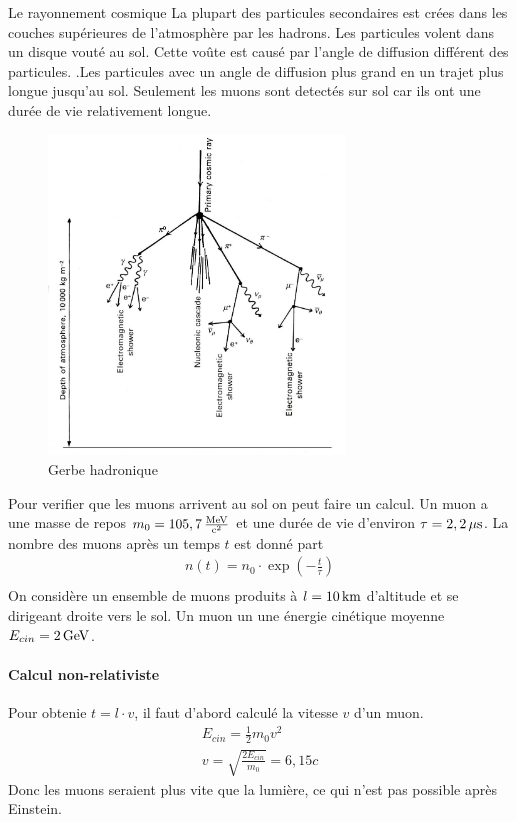 \documentclass[a4paper,11pt,liststotocnumbered,bibtotocnumbered]{scrartcl}
\begin{document}
\begin{section}{Le rayonnement cosmique}
   La plupart des particules secondaires est crées dans les couches supérieures de l'atmosphère par les hadrons. Les particules volent dans un disque vouté au sol. Cette voûte est causé par l'angle de diffusion différent des particules. .Les particules avec un angle de diffusion plus grand en un trajet plus longue jusqu'au sol. Seulement les muons sont detectés sur sol car ils ont une durée de vie relativement longue. 
   \begin{figure}[H]
    \center
     \includegraphics[width=0.7\textwidth]{bilder/hadronischer_schauer.jpg}
     \caption{Gerbe hadronique}
   \end{figure}
    
   Pour verifier que les muons arrivent au sol on peut faire un calcul. Un muon a une masse de repos $m_0=\unit[105,7]{\frac{MeV}{c^2}}$ et une durée de vie d'environ $\tau=\unit[2,2]{\mu s}$. La nombre des muons après un temps $t$ est donné part
   \begin{eqnarray*}
    n(t)=n_0\cdot\exp\left(-\frac{t}{\tau}\right)\\
   \end{eqnarray*}
   On considère un ensemble de muons produits à $l=\unit[10]{km}$ d'altitude et se dirigeant droite vers le sol. Un muon un une énergie cinétique moyenne $E_{cin}=\unit[2]{GeV}$.
   \paragraph{Calcul non-relativiste}
    Pour obtenie $t=l\cdot v$, il faut d'abord calculé la vitesse $v$ d'un muon.
    \begin{eqnarray*}
     E_{cin}=\frac{1}{2}m_0v^2\\
     v=\sqrt{\frac{2E_{cin}}{m_0}}=6,15c
    \end{eqnarray*}
    Donc les muons seraient plus vite que la lumière, ce qui n'est pas possible après Einstein.


\end{section}
\end{document}
